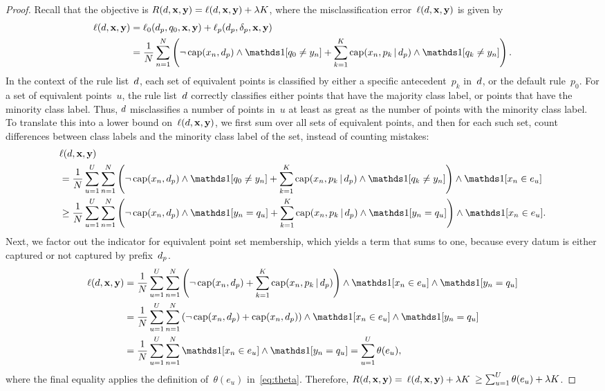 \begin{arxiv}
\begin{proof}
Recall that the objective is ${R({d}, \mathbf{x}, \mathbf{y}) = \ell({d}, \mathbf{x}, \mathbf{y}) + {\lambda} K}$,
where the misclassification error~${\ell({d}, \mathbf{x}, \mathbf{y})}$ is given by
\begin{align}
\Loss(\RL, \x, \y) &= \Loss_0(\Prefix, \Default, \x, \y) + \Loss_p(\Prefix, \Labels, \x, \y) \nn \\
&= \frac{1}{N} \sum_{n=1}^N \left( \neg\, \Cap(x_n, \Prefix) \wedge \one[q_0 \neq y_n]
   + \sum_{k=1}^K \Cap(x_n, p_k \given \Prefix) \wedge \one [q_k \neq y_n] \right).
\end{align}
In the context of the rule list~${d}$, each set of equivalent points is classified by
either a specific antecedent~$p_k$ in~${d}$, or the default rule~$p_0$.
%
For a set of equivalent points~$u$, the rule list~${d}$ correctly classifies either
points that have the majority class label, or points that have the minority class label.
%
Thus, ${d}$ misclassifies a number of points in~$u$ at least as great as
the number of points with the minority class label.
%
To translate this into a lower bound on~$\ell({d}, \mathbf{x}, \mathbf{y})$,
we first sum over all sets of equivalent points, and then for each such set,
count differences between class labels and the minority class label of the set,
instead of counting mistakes:
\begin{align}
&\Loss(\RL, \x, \y) \nn \\
&= \frac{1}{N} \sum_{u=1}^U \sum_{n=1}^N \left( \neg\, \Cap(x_n, \Prefix) \wedge \one[q_0 \neq y_n]
   + \sum_{k=1}^K \Cap(x_n, p_k \given \Prefix) \wedge \one [q_k \neq y_n] \right)
   \wedge \one [x_n \in e_u]  \nn \\
&\ge \frac{1}{N} \sum_{u=1}^U \sum_{n=1}^N \left( \neg\, \Cap(x_n, \Prefix) \wedge \one[y_n = q_u]
   + \sum_{k=1}^K \Cap(x_n, p_k \given \Prefix) \wedge \one [y_n = q_u] \right)
   \wedge \one [x_n \in e_u].
\label{eq:lb-equiv-pts}
\end{align}
Next, we factor out the indicator for equivalent point set membership,
which yields a term that sums to one, because every datum is either captured or
not captured by prefix~$d_p$.
\begin{align}
\Loss(\RL, \x, \y) &= \frac{1}{N} \sum_{u=1}^U \sum_{n=1}^N \left( \neg\, \Cap(x_n, \Prefix)
   + \sum_{k=1}^K \Cap(x_n, p_k \given \Prefix) \right)
   \wedge \one [x_n \in e_u] \wedge \one[y_n = q_u] \nn \\
&= \frac{1}{N} \sum_{u=1}^U \sum_{n=1}^N \left( \neg\, \Cap(x_n, \Prefix)
   + \Cap(x_n, \Prefix) \right)
   \wedge \one [x_n \in e_u] \wedge \one[y_n = q_u] \nn \\
&= \frac{1}{N} \sum_{u=1}^U \sum_{n=1}^N \one [ x_n \in e_u ] \wedge \one [ y_n = q_u ]
= \sum_{u=1}^U \theta(e_u),
\end{align}
where the final equality applies the definition of~$\theta(e_u)$ in~\eqref{eq:theta}.
%
Therefore, ${R({d}, \mathbf{x}, \mathbf{y}) =}$ ${\ell({d}, \mathbf{x}, \mathbf{y}) + {\lambda} K}$ ${\ge \sum_{u=1}^U \theta(e_u) + {\lambda} K}$.
\end{proof}
\end{arxiv}

